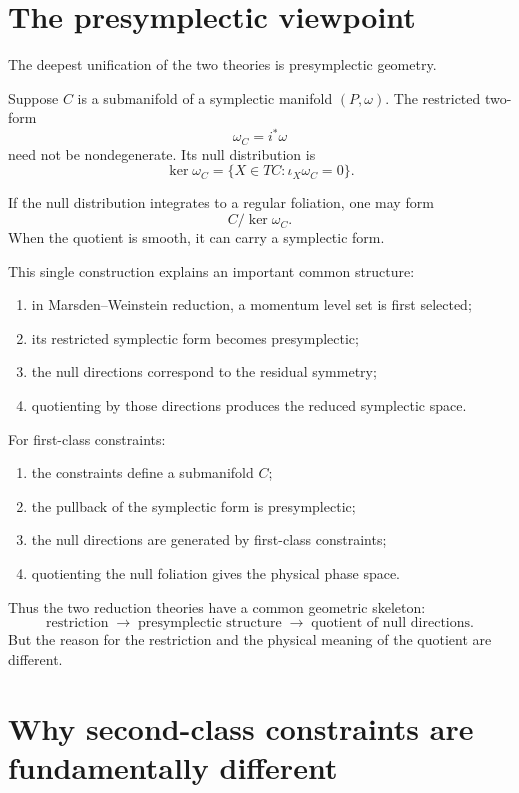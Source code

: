 \section{The presymplectic viewpoint}

The deepest unification of the two theories is presymplectic geometry.

Suppose $C$ is a submanifold of a symplectic manifold $(P,\omega)$.  The
restricted two-form
\[
        \omega_C=i^*\omega
\]
need not be nondegenerate.  Its null distribution is
\[
        \ker\omega_C
        =
        \{X\in TC:\iota_X\omega_C=0\}.
\]

If the null distribution integrates to a regular foliation, one may form
\[
        C/\ker\omega_C.
\]
When the quotient is smooth, it can carry a symplectic form.

This single construction explains an important common structure:

\begin{enumerate}
\item in Marsden--Weinstein reduction, a momentum level set is first selected;
\item its restricted symplectic form becomes presymplectic;
\item the null directions correspond to the residual symmetry;
\item quotienting by those directions produces the reduced symplectic space.
\end{enumerate}

For first-class constraints:

\begin{enumerate}
\item the constraints define a submanifold $C$;
\item the pullback of the symplectic form is presymplectic;
\item the null directions are generated by first-class constraints;
\item quotienting the null foliation gives the physical phase space.
\end{enumerate}

Thus the two reduction theories have a common geometric skeleton:
\[
        \boxed{
        \text{restriction}
        \;\longrightarrow\;
        \text{presymplectic structure}
        \;\longrightarrow\;
        \text{quotient of null directions}.
        }
\]
But the reason for the restriction and the physical meaning of the quotient
are different.

\section{Why second-class constraints are fundamentally different}

